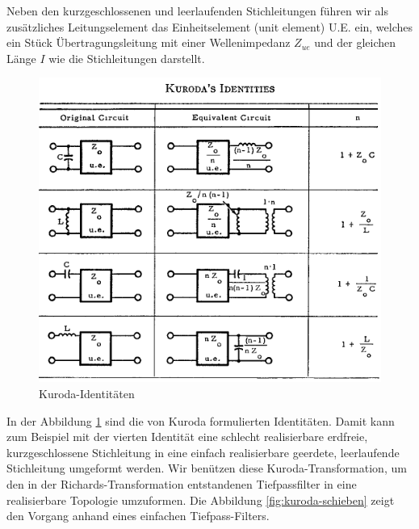 Neben den kurzgeschlossenen und leerlaufenden  Stichleitungen f\"uhren wir als
zus\"atzliches  Leitungselement das Einheitselement (unit element)  U.E.  ein,
welches  ein  St\"uck  \"Ubertragungsleitung mit einer Wellenimpedanz $Z_{ue}$
und der gleichen L\"ange $I$ wie die Stichleitungen darstellt.

\begin{figure}[h!]
    \centering
    \includegraphics[width=\imagewidth]{images/kuroda-identities}
    \caption{Kuroda-Identit\"aten}
    \label{fig:kuroda-identities}
\end{figure}

In     der     Abbildung    \ref{fig:kuroda-identities}    sind    die     von
Kuroda\cite{ref:kuroda} formulierten Identit\"aten.  Damit  kann  zum Beispiel
mit   der   vierten  Identit\"at   eine   schlecht   realisierbare   erdfreie,
kurzgeschlossene  Stichleitung   in   eine   einfach  realisierbare  geerdete,
leerlaufende    Stichleitung    umgeformt    werden.    Wir   benützen   diese
Kuroda-Transformation,  um  den in  der  Richards-Transformation  entstandenen
Tiefpassfilter  in  eine  realisierbare  Topologie umzuformen.  Die  Abbildung
\ref{fig:kuroda-schieben}   zeigt   den   Vorgang   anhand   eines   einfachen
Tiefpass-Filters.

